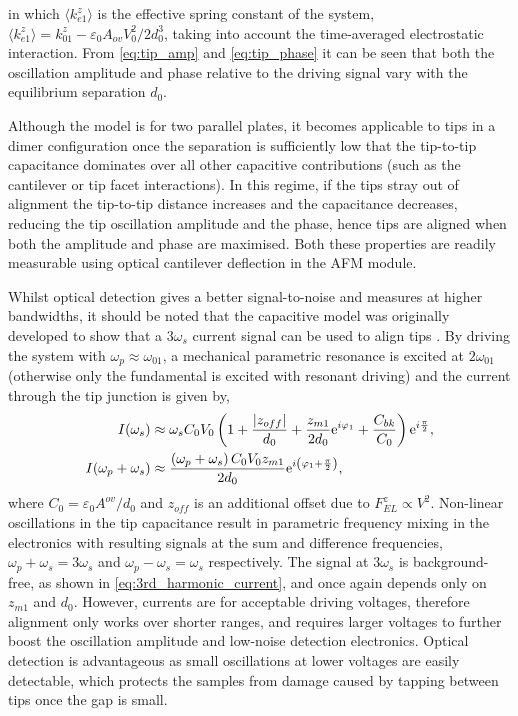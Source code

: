 \documentclass{article}
\begin{document}
in which $\langle k_{e1}^z \rangle$ is the effective spring constant of the system, $\langle k_{e1}^{z} \rangle = k_{01}^z - {\varepsilon_0 A_{ov} V_0^2}/{2d_0^3}$, taking into account the time-averaged electrostatic interaction. From \eqref{eq:tip_amp} and \eqref{eq:tip_phase} it can be seen that both the oscillation amplitude and phase relative to the driving signal vary with the equilibrium separation $d_0$.

Although the model is for two parallel plates, it becomes applicable to tips in a dimer configuration once the separation is sufficiently low that the tip-to-tip capacitance dominates over all other capacitive contributions (such as the cantilever or tip facet interactions). In this regime, if the tips stray out of alignment the tip-to-tip distance increases and the capacitance decreases, reducing the tip oscillation amplitude and the phase, hence tips are aligned when both the amplitude and phase are maximised. Both these properties are readily measurable using optical cantilever deflection in the AFM module.

Whilst optical detection gives a better signal-to-noise and measures at higher bandwidths, it should be noted that the capacitive model was originally developed to show that a $3\omega_s$ current signal can be used to align tips \cite{savage2011}. By driving the system with $\omega_p \approx \omega_{01}$, a mechanical parametric resonance is excited at $2\omega_{01}$ (otherwise only the fundamental is excited with resonant driving) and the current through the tip junction is given by,
\begin{subequations}
\begin{align}
I(\omega_{s}) & \approx \omega_{s}C_{0}V_{0} \left(1+\frac{|z_{off}|}{d_{0}}+\frac{z_{m1}}{2d_{0}}\e^{i\varphi_1}+\frac{C_{bk}}{C_{0}}\right)\e^{i\frac{\pi}{2}},\\
%
I(\omega_{p}+\omega_{s}) & \approx \frac{\left(\omega_{p}+\omega_{s}\right)C_{0}V_{0}z_{m1}}{2d_{0}} \e^{i\left(\varphi_1 + \frac{\pi}{2}\right)},
\label{eq:3rd_harmonic_current}
\end{align}
\end{subequations}
where $C_0 = \varepsilon_0 A^{ov} / d_0$ and $z_{off}$ is an additional offset due to $F_{EL}^z \propto V^2$. Non-linear oscillations in the tip capacitance result in parametric frequency mixing in the electronics with resulting signals at the sum and difference frequencies, $\omega_{p}+\omega_{s}=3\omega_{s}$ and $\omega_{p}-\omega_{s}=\omega_{s}$ respectively. The signal at $3\omega_{s}$ is background-free, as shown in \eqref{eq:3rd_harmonic_current}, and once again depends only on $z_{m1}$ and $d_{0}$. However, currents are  for acceptable driving voltages, therefore alignment only works over shorter ranges, and requires larger voltages to further boost the oscillation amplitude and low-noise detection electronics. Optical detection is advantageous as small oscillations at lower voltages are easily detectable, which protects the samples from damage caused by tapping between tips once the gap is small.
\end{document}
